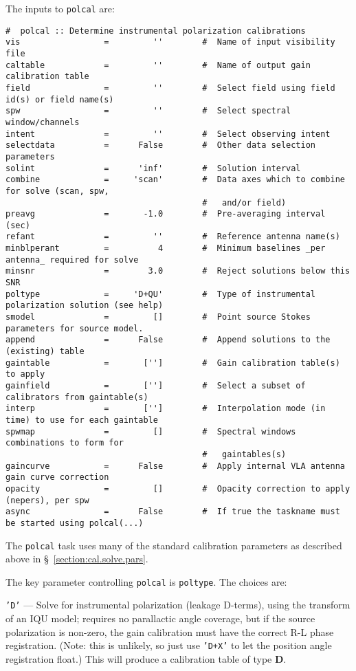 {The inputs to {\tt polcal} are:
\small
\begin{verbatim}
#  polcal :: Determine instrumental polarization calibrations
vis                 =         ''        #  Name of input visibility file
caltable            =         ''        #  Name of output gain calibration table
field               =         ''        #  Select field using field id(s) or field name(s)
spw                 =         ''        #  Select spectral window/channels
intent              =         ''        #  Select observing intent
selectdata          =      False        #  Other data selection parameters
solint              =      'inf'        #  Solution interval
combine             =     'scan'        #  Data axes which to combine for solve (scan, spw,
                                        #   and/or field)
preavg              =       -1.0        #  Pre-averaging interval (sec)
refant              =         ''        #  Reference antenna name(s)
minblperant         =          4        #  Minimum baselines _per antenna_ required for solve
minsnr              =        3.0        #  Reject solutions below this SNR
poltype             =     'D+QU'        #  Type of instrumental polarization solution (see help)
smodel              =         []        #  Point source Stokes parameters for source model.
append              =      False        #  Append solutions to the (existing) table
gaintable           =       ['']        #  Gain calibration table(s) to apply
gainfield           =       ['']        #  Select a subset of calibrators from gaintable(s)
interp              =       ['']        #  Interpolation mode (in time) to use for each gaintable
spwmap              =         []        #  Spectral windows combinations to form for
                                        #   gaintables(s)
gaincurve           =      False        #  Apply internal VLA antenna gain curve correction
opacity             =         []        #  Opacity correction to apply (nepers), per spw
async               =      False        #  If true the taskname must be started using polcal(...)
\end{verbatim}
\normalsize
The {\tt polcal} task uses many of the standard calibration parameters
as described above in \S~\ref{section:cal.solve.pars}.

The key parameter controlling {\tt polcal} is {\tt poltype}.  The
choices are:
\begin{description}
\item{\tt 'D'} --- Solve for instrumental polarization (leakage D-terms),
using the transform of an IQU model; requires no
parallactic angle coverage, but if the source polarization is non-zero,
the gain calibration must have the correct R-L phase registration.
(Note: this is unlikely, so just use {\tt 'D+X'} to let the position
angle registration float.) This will produce a calibration table of
type {\bf D}.


\end{description}}
